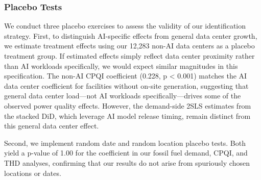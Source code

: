 \documentclass[a4paper,fleqn,longmktitle]{cas-sc}
\begin{document}
 \subsubsection{Placebo Tests}
We conduct three placebo exercises to assess the validity of our identification strategy. First, to distinguish AI-specific effects from general data center growth, we estimate treatment effects using our 12,283 non-AI data centers as a placebo treatment group. If estimated effects simply reflect data center proximity rather than AI workloads specifically, we would expect similar magnitudes in this specification. The non-AI CPQI coefficient (0.228, p < 0.001) matches the AI data center coefficient for facilities without on-site generation, suggesting that general data center load---not AI workloads specifically---drives some of the observed power quality effects. However, the demand-side 2SLS estimates from the stacked DiD, which leverage AI model release timing, remain distinct from this general data center effect.

Second, we implement random date and random location placebo tests. Both yield a p-value of 1.00 for the coefficient in our fossil fuel demand, CPQI, and THD analyses, confirming that our results do not arise from spuriously chosen locations or dates.




\end{document}
